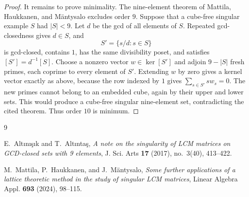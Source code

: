 \documentclass[11pt]{amsart}
\begin{document}
\begin{proof}
It remains to prove minimality. The nine-element theorem of Mattila,
Haukkanen, and M\"antysalo excludes order $9$. Suppose that a cube-free
singular example $S$ had $|S|<9$. Let $d$ be the gcd of all elements of $S$.
Repeated gcd-closedness gives $d\in S$, and
\[
 S'=\{s/d:s\in S\}
\]
is gcd-closed, contains $1$, has the same divisibility poset, and satisfies
$[S']=d^{-1}[S]$. Choose a nonzero vector $w\in\ker[S']$ and adjoin
$9-|S|$ fresh primes, each coprime to every element of $S'$. Extending $w$ by
zero gives a kernel vector exactly as above, because the row indexed by $1$
gives $\sum_{s\in S'}s w_s=0$. The new primes cannot belong to an embedded
cube, again by their upper and lower sets. This would produce a cube-free
singular nine-element set, contradicting the cited theorem. Thus order $10$ is
minimum.
\end{proof}

\begin{thebibliography}{9}

E.~Alt\i n\i \c{s}\i k and T.~Alt\i nta\c{s},
\emph{A note on the singularity of LCM matrices on GCD-closed sets with
9 elements}, J. Sci. Arts \textbf{17} (2017), no.~3(40), 413--422.

M.~Mattila, P.~Haukkanen, and J.~M\"antysalo,
\emph{Some further applications of a lattice theoretic method in the study of
singular LCM matrices}, Linear Algebra Appl. \textbf{693} (2024), 98--115.

\end{thebibliography}
\end{document}
